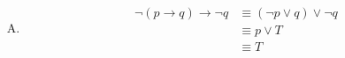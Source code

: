 {{\begin{practices}
\begin{enumerate}[A.]
                {
                    \begin{align*}
                        \neg (p \rightarrow q) \rightarrow p
                        &\equiv (\neg p \vee q) \vee p \\
                        &\equiv T \vee q \\
                        &\equiv T
                    \end{align*}
                }
                \item
                {
                    \begin{align*}
                        \neg (p \rightarrow q) \rightarrow \neg q
                        &\equiv (\neg p \vee q) \vee \neg q \\
                        &\equiv p \vee T \\
                        &\equiv T
                    \end{align*}
                }
            \end{enumerate}
        \end{practices}

}}
